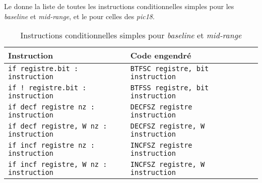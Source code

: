 Le  donne la liste de toutes les instructions conditionnelles simples pour les \emph{baseline} et \emph{mid-range}, et le  pour celles des \emph{pic18}.

\begin{table}[!ht]
  \centering
  \small
  \begin{tabular}{lp{4cm}lll}
    \textbf{Instruction} & \textbf{Code engendré}\\
    \hline
    \texttt{if registre.bit : instruction} & \texttt{BTFSC registre, bit instruction} \\
    \texttt{if ! registre.bit : instruction} & \texttt{BTFSS registre, bit instruction} \\
    \texttt{if decf registre nz : instruction} & \texttt{DECFSZ registre instruction} \\
    \texttt{if decf registre, W nz : instruction} & \texttt{DECFSZ registre, W instruction} \\
    \texttt{if incf registre nz : instruction} & \texttt{INCFSZ registre instruction} \\
    \texttt{if incf registre, W nz : instruction} & \texttt{INCFSZ registre, W instruction} \\
    \hline
  \end{tabular}
  \caption{Instructions conditionnelles simples pour \emph{baseline} et \emph{mid-range}}
\end{table}

